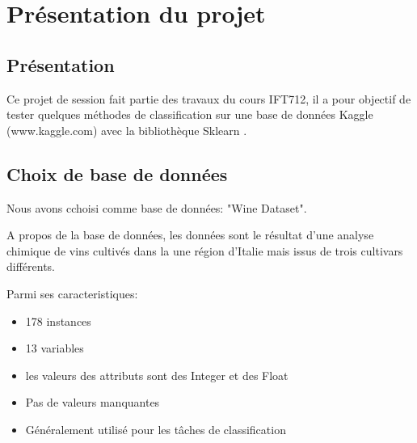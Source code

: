 \chapter{Présentation du projet}
\section{Présentation}
\par Ce projet de session fait partie des travaux du cours IFT712, il a pour objectif de tester quelques méthodes de classification sur une base de données
Kaggle (www.kaggle.com) avec la bibliothèque Sklearn .
\section{Choix de base de données}
\par Nous avons cchoisi comme base de données: "Wine Dataset".
\par A propos de la base de données, les données sont le résultat d'une analyse chimique de vins cultivés dans la une région d'Italie mais issus de trois cultivars différents.
\par Parmi ses caracteristiques:
\begin{itemize}[label=\textbullet]
    \item 178 instances
    \item 13 variables
    \item les valeurs des attributs sont des Integer et des Float
    \item Pas de valeurs manquantes
    \item Généralement utilisé pour les tâches de classification
\end{itemize}
